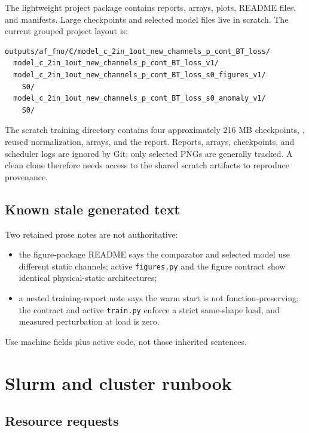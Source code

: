 \documentclass[11pt,oneside]{report}
\newcommand{\repo}[1]{\nolinkurl{#1}}
\newcommand{\code}[1]{\texttt{\detokenize{#1}}}
\begin{document}
The lightweight project package contains reports, arrays, plots, README files,
and manifests. Large checkpoints and selected model files live in scratch.
The current grouped project layout is:
\begin{lstlisting}
outputs/af_fno/C/model_c_2in_1out_new_channels_p_cont_BT_loss/
  model_c_2in_1out_new_channels_p_cont_BT_loss_v1/
  model_c_2in_1out_new_channels_p_cont_BT_loss_s0_figures_v1/
    S0/
  model_c_2in_1out_new_channels_p_cont_BT_loss_s0_anomaly_v1/
    S0/
\end{lstlisting}

The scratch training directory contains four approximately 216 MB checkpoints,
\code{selected.pt}, reused normalization, arrays, and the report. Reports,
arrays, checkpoints, and scheduler logs are ignored by Git; only selected PNGs
are generally tracked. A clean clone therefore needs access to the shared
scratch artifacts to reproduce provenance.

\section{Known stale generated text}

Two retained prose notes are not authoritative:

\begin{itemize}
  \item the figure-package README says the comparator and selected model use
        different static channels; active \repo{figures.py} and the figure
        contract show identical physical-static architectures;
  \item a nested training-report note says the warm start is not
        function-preserving; the contract and active \repo{train.py} enforce a
        strict same-shape load, and measured perturbation at load is zero.
\end{itemize}

Use machine fields plus active code, not those inherited sentences.

\chapter{Slurm and cluster runbook}
\label{ch:slurm}

\section{Resource requests}
\end{document}
